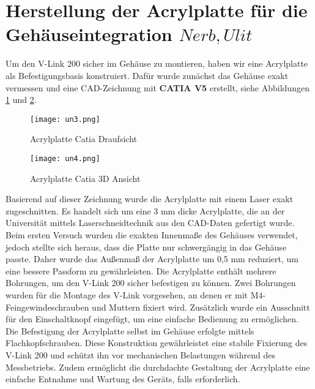 \newpage{}
\section{Herstellung der Acrylplatte f\"ur die Geh\"auseintegration \(Nerb, Ulit\)}
Um den V-Link 200 sicher im Gehäuse zu montieren, haben wir eine Acrylplatte als Befestigungsbasis konstruiert.
Dafür wurde zunächst das Gehäuse exakt vermessen und eine CAD-Zeichnung mit \textbf{CATIA V5} erstellt, siehe Abbildungen \ref{fig:un3} und \ref{fig:un4}.
\begin{figure}[htbp]
    \begin{center}
        \texttt{[image: un3.png]}
        \caption[Acrylplatte Catia Draufsicht (Abbildungsverzeichnis)]{Acrylplatte Catia Draufsicht}
        \label{fig:un3}
    \end{center}
\end{figure}
\begin{figure}[htbp]
    \begin{center}
        \texttt{[image: un4.png]}
        \caption[Acrylplatte Catia 3D Ansicht (Abbildungsverzeichnis)]{Acrylplatte Catia 3D Ansicht}
        \label{fig:un4}
    \end{center}
\end{figure}

Basierend auf dieser Zeichnung wurde die Acrylplatte mit einem Laser exakt zugeschnitten.
Es handelt sich um eine 3 mm dicke Acrylplatte, die an der Universität mittels Laserschneidtechnik aus den CAD-Daten gefertigt wurde.
Beim ersten Versuch wurden die exakten Innenmaße des Gehäuses verwendet, jedoch stellte sich heraus, dass die Platte nur schwergängig in das Gehäuse passte.
Daher wurde das Außenmaß der Acrylplatte um 0,5 mm reduziert, um eine bessere Passform zu gewährleisten.
Die Acrylplatte enthält mehrere Bohrungen, um den V-Link 200 sicher befestigen zu können.
Zwei Bohrungen wurden für die Montage des V-Link vorgesehen, an denen er mit M4-Feingewindeschrauben und Muttern fixiert wird.
Zusätzlich wurde ein Ausschnitt für den Einschaltknopf eingefügt, um eine einfache Bedienung zu ermöglichen.
Die Befestigung der Acrylplatte selbst im Gehäuse erfolgte mittels Flachkopfschrauben.
Diese Konstruktion gewährleistet eine stabile Fixierung des V-Link 200 und schützt ihn vor mechanischen Belastungen während des Messbetriebs.
Zudem ermöglicht die durchdachte Gestaltung der Acrylplatte eine einfache Entnahme und Wartung des Geräts, falls erforderlich.

